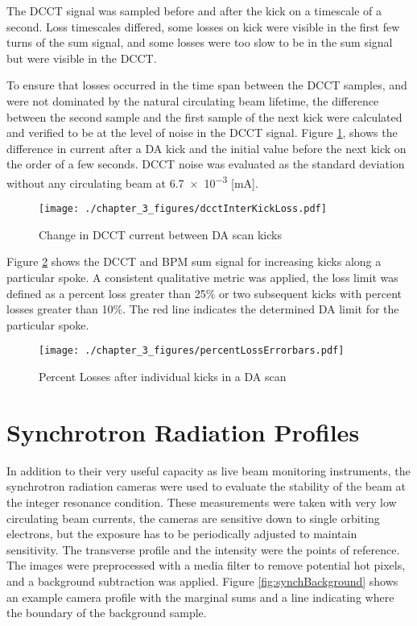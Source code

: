 The DCCT signal was sampled before and after the kick on a timescale of a second. Loss timescales differed, some losses on kick were visible in the first few turns of the sum signal, and some losses were too slow to be in the sum signal but were visible in the DCCT. 

To ensure that losses occurred in the time span between the DCCT samples, and were not dominated by the natural circulating beam lifetime, the difference between the second sample and the first sample of the next kick were calculated and verified to be at the level of noise in the DCCT signal. Figure \ref{fig:dcctKickLife}, shows the difference in current after a DA kick and the initial value before the next kick on the order of a few seconds. DCCT noise was evaluated as the standard deviation without any circulating beam at \num{6.7e-3} [mA].

\begin{figure}
	\centering
	\texttt{[image: ./chapter\_3\_figures/dcctInterKickLoss.pdf]}
	\caption{Change in DCCT current between DA scan kicks}
	\label{fig:dcctKickLife}
\end{figure}

Figure \ref{fig:daLimit} shows the DCCT and BPM sum signal for increasing kicks along a particular spoke. A consistent qualitative metric was applied, the loss limit was defined as a percent loss greater than 25\% or two subsequent kicks with percent losses greater than 10\%. The red line indicates the determined DA limit for the particular spoke.

\begin{figure}
	\centering
	\texttt{[image: ./chapter\_3\_figures/percentLossErrorbars.pdf]}
	\caption{Percent Losses after individual kicks in a DA scan}
	\label{fig:daLimit}
\end{figure}

\section{Synchrotron Radiation Profiles} \label{sec:synchProfiles}
In addition to their very useful capacity as live beam monitoring instruments, the synchrotron radiation cameras were used to evaluate the stability of the beam at the integer resonance condition. These measurements were taken with very low circulating beam currents, the cameras are sensitive down to single orbiting electrons, but the exposure has to be periodically adjusted to maintain sensitivity. The transverse profile and the intensity were the points of reference. The images were preprocessed with a media filter to remove potential hot pixels, and a background subtraction was applied. Figure \ref{fig:synchBackground} shows an example camera profile with the marginal sums and a line indicating where the boundary of the background sample.

